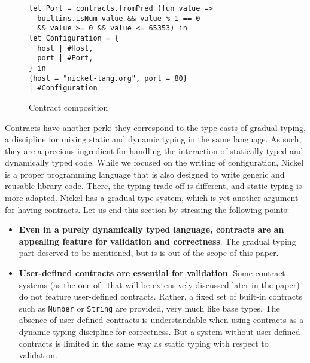 \documentclass[sigplan,10pt,review,anonymous]{acmart}
\newcommand{\unsure}[2][1=]{}
\newcommand{\nickel}[1]{\lstinline[language=nickel]{#1}}
\begin{document}
\begin{figure}
  \begin{center}
\begin{lstlisting}[language=nickel]
let Port = contracts.fromPred (fun value =>
  builtins.isNum value && value % 1 == 0
  && value >= 0 && value <= 65353) in
let Configuration = {
  host | #Host,
  port | #Port,
} in
{host = "nickel-lang.org", port = 80}
| #Configuration
\end{lstlisting}
  \end{center}
\caption{Contract composition}
\label{fig:contract-composition}
\end{figure}
\unsure{I wouldn't use nickel-lang.org unless you are
planning on putting something up there. Maybe nixos.org?}

Contracts have another perk: they correspond to the type casts of gradual
typing, a discipline for mixing static and dynamic typing in the same language.
As such, they are a precious ingredient for handling the interaction of
statically typed and dynamically typed code. While we focused on the writing of
configuration, Nickel is a proper programming language that is also designed to
write generic and reusable library code. There, the typing trade-off is
different, and static typing is more adapted. Nickel has a gradual type system,
which is yet another argument for having contracts. Let us end this section by
stressing the following points:
\begin{itemize}
    \item \textbf{Even in a purely dynamically typed language, contracts are an
        appealing feature for validation and correctness}. The gradual
        typing part deserved to be mentioned, but is is out of the scope of this
        paper. 
    \item \textbf{User-defined contracts are essential for validation}. Some contract
        systems (as the one of~\cite{RootCauseOfBlame} that will be extensively
        discussed later in the paper) do not feature user-defined contracts.
        Rather, a fixed set of built-in contracts such as \nickel{Number} or
        \nickel{String} are provided, very much like base types. The absence of
        user-defined contracts is understandable when using contracts as a
        dynamic typing discipline for correctness. But a system without
        user-defined contracts is limited in the same way as static typing with
        respect to validation.
\end{itemize}

\newpage
\end{document}
